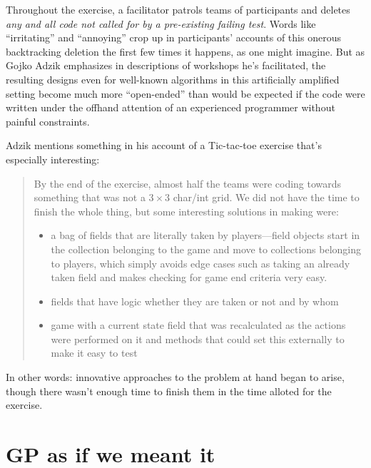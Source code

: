 Throughout the exercise, a facilitator patrols teams of participants and deletes \emph{any and all code not called for by a pre-existing failing test}. Words like ``irritating'' and ``annoying'' crop up in participants' accounts of  this onerous backtracking deletion the first few times it happens, as one might imagine. But as Gojko Adzik emphasizes in descriptions of workshops he's facilitated, the resulting designs even for well-known algorithms in this artificially amplified setting become much more ``open-ended'' than would be expected if the code were written under the offhand attention of an experienced programmer without painful constraints.

Adzik mentions something in his account of a Tic-tac-toe exercise that's especially interesting:

\begin{quotation}
By the end of the exercise, almost half the teams were coding towards something that was not a $3\times 3$ char/int grid. We did not have the time to finish the whole thing, but some interesting solutions in making were:

\begin{itemize}
\item a bag of fields that are literally taken by players---field objects start in the collection belonging to the game and move to collections belonging to players, which simply avoids edge cases such as taking an already taken field and makes checking for game end criteria very easy.
\item fields that have logic whether they are taken or not and by whom
\item game with a current state field that was recalculated as the actions were performed on it and methods that could set this externally to make it easy to test
\end{itemize}
\end{quotation}

In other words: innovative approaches to the problem at hand began to arise, though there wasn't enough time to finish them in the time alloted for the exercise.

\section{GP as if we meant it}\hypertarget{gp-as-if-we-meant-it}{}\label{gp-as-if-we-meant-it}

